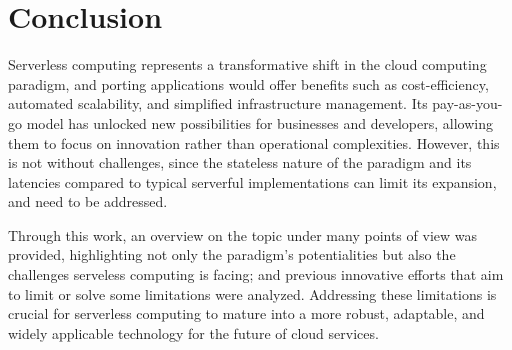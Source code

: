 \documentclass[
	a4paper, %
	12pt,
	twoside, %
]{LTJournalArticle}
\begin{document}
\section{Conclusion}
Serverless computing represents a transformative shift in the cloud computing paradigm, and porting applications would offer benefits such as cost-efficiency, automated scalability, and simplified infrastructure management. Its pay-as-you-go model has unlocked new possibilities for businesses and developers, allowing them to focus on innovation rather than operational complexities. However, this is not without challenges, since the stateless nature of the paradigm and its latencies compared to typical serverful implementations can limit its expansion, and need to be addressed. 

Through this work, an overview on the topic under many points of view was provided, highlighting not only the paradigm's potentialities but also the challenges serveless computing is facing; and previous innovative efforts that aim to limit or solve some limitations were analyzed. Addressing these limitations is crucial for serverless computing to mature into a more robust, adaptable, and widely applicable technology for the future of cloud services.




\end{document}
